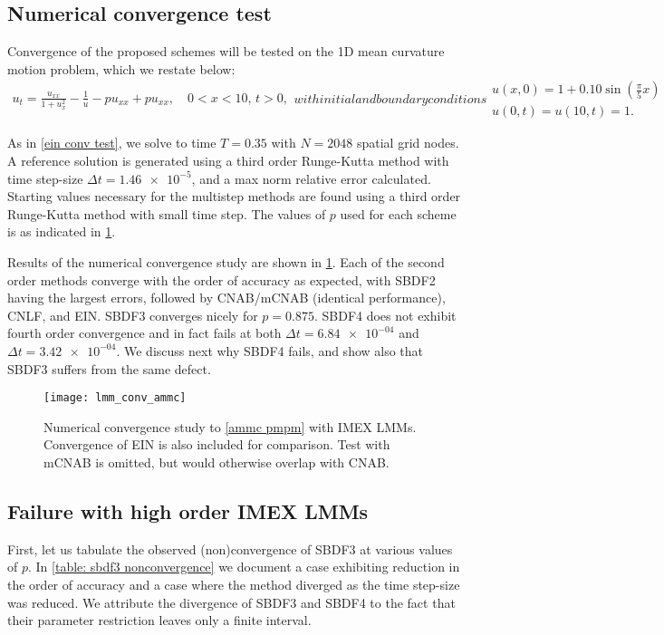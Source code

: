 \subsection{Numerical convergence test}
Convergence of the proposed schemes will be tested on the 1D mean curvature motion problem, which we restate below:
\begin{subequations}
\begin{align}
        u_t = \frac{u_{xx}}{1 + u_x^2} - \frac{1}{u} - pu_{xx} + pu_{xx},
\quad 0< x< 10,\, t>0,
\end{align}
with initial and boundary conditions
\begin{gather}
        u(x,0) = 1 + 0.10\sin\left(\frac{\pi}{5}x \right) 
\\
u(0,t) = u(10,t) = 1.
\end{gather}
\label{ammc pmpm}
\end{subequations}

As in \cref{ein conv test}, we solve to time $T=0.35$ with $N=2048$ spatial grid nodes. A reference solution is generated using a third order Runge-Kutta method with time step-size $\Delta t = \num{1.46e-5}$, and a max norm relative error calculated. Starting values necessary for the multistep methods are found using a third order Runge-Kutta method with small time step. The values of $p$ used for each scheme is as indicated in \cref{lmm conv test}.

Results of the numerical convergence study are shown in \cref{lmm conv test}. Each of the second order methods converge with the order of accuracy as expected, with SBDF2 having the largest errors, followed by CNAB/mCNAB (identical performance), CNLF, and EIN. SBDF3 converges nicely for $p=0.875$. SBDF4 does not exhibit fourth order convergence and in fact fails at both $\Delta t =\num{6.84e-04}$ and $\Delta t=\num{3.42e-04}$. We discuss next why SBDF4 fails, and show also that SBDF3 suffers from the same defect.

\begin{figure}
        \centering
\texttt{[image: lmm\_conv\_ammc]}
\caption[Numerical convergence study with IMEX LMMs]{Numerical convergence study to \cref{ammc pmpm} with IMEX LMMs. Convergence of EIN is also included for comparison. Test with mCNAB is omitted, but would otherwise overlap with CNAB.}
\label{lmm conv test}
\end{figure}

\subsection{Failure with high order IMEX LMMs}
First, let us tabulate the observed (non)convergence of SBDF3 at various values of $p$. In \cref{table: sbdf3 nonconvergence} we document a case exhibiting reduction in the order of accuracy and a case where the method diverged as the time step-size was reduced. We attribute the divergence of SBDF3 and SBDF4 to the fact that their parameter restriction leaves only a finite interval.

